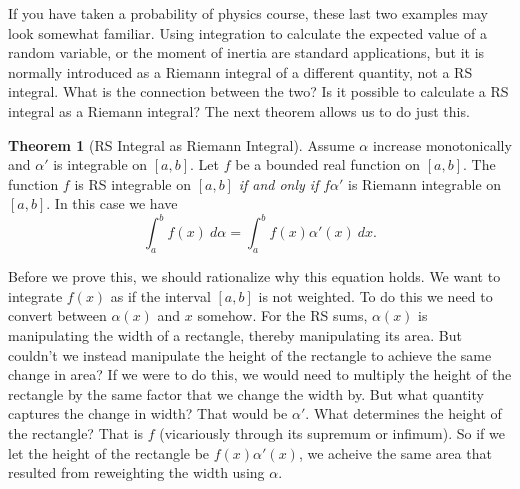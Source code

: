 \documentclass{article}
\theoremstyle{definition}
\newtheorem{theorem}{Theorem}[section]
\begin{document}
	If you have taken a probability of physics course, these last two examples may look somewhat familiar. Using integration to calculate the expected value of a random variable, or the moment of inertia are standard applications, but it is normally introduced as a Riemann integral of a different quantity, not a RS integral. What is the connection between the two? Is it possible to calculate a RS integral as a Riemann integral? The next theorem allows us to do just this.
	\begin{theorem}[RS Integral as Riemann Integral]
		Assume $ \alpha $ increase monotonically and $ \alpha' $ is integrable on $ [a,b] $. Let $ f $ be a bounded real function on $ [a,b] $. The function $ f $ is RS integrable on $ [a,b] $ \textit{if and only if} $ f\alpha' $ is Riemann integrable on $ [a,b] $. In this case we have 
		$$ \int_{a}^{b}f(x)\ d\alpha=\int_{a}^{b}f(x)\alpha'(x)\ dx .$$
	\end{theorem} 
	Before we prove this, we should rationalize why this equation holds. We want to integrate $ f(x) $ as if the interval $ [a,b] $ is not weighted. To do this we need to convert between $ \alpha(x) $ and $ x $ somehow. For the RS sums, $ \alpha(x) $ is manipulating the width of a rectangle, thereby manipulating its area. But couldn't we instead manipulate the height of the rectangle to achieve the same change in area? If we were to do this, we would need to multiply the height of the rectangle by the same factor that we change the width by. But what quantity captures the change in width? That would be $ \alpha' $. What determines the height of the rectangle? That is $ f $ (vicariously through its supremum or infimum). So if we let the height of the rectangle be $ f(x)\alpha'(x) $, we acheive the same area that resulted from reweighting the width using $ \alpha $.
	
\end{document}
